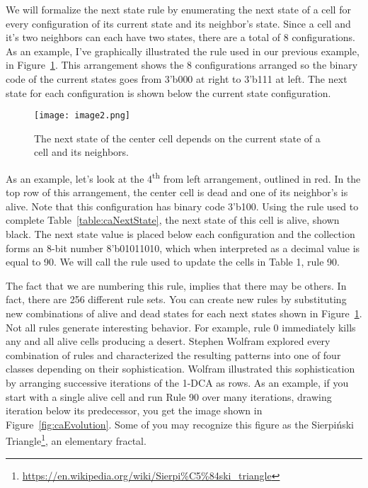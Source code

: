 We will formalize the next state rule by enumerating the next state of a
cell for every configuration of its current state and its neighbor's
state. Since a cell and it's two neighbors can each have two states,
there are a total of 8 configurations. As an example, I've graphically
illustrated the rule used in our previous example, in Figure~\ref{fig:caRule}. This
arrangement shows the 8 configurations arranged so the binary code of
the current states goes from 3'b000 at right to 3'b111 at left. The next
state for each configuration is shown below the current state
configuration.

\begin{figure}[ht]
\texttt{[image: image2.png]}
\caption{The next state of the center cell depends on the current state
of a cell and its neighbors.}
\label{fig:caRule}
\end{figure}


\pagebreak


As an example, let's look at the 4\textsuperscript{th} from left
arrangement, outlined in red. In the top row of this arrangement, the
center cell is dead and one of its neighbor's is alive.  Note that this
configuration has binary code 3'b100. Using the rule used to complete
Table~\ref{table:caNextState}, the next state of this cell is alive, shown black. The next
state value is placed below each configuration and the collection forms
an 8-bit number 8'b01011010, which when interpreted as a decimal value
is equal to 90. We will call the rule used to update the cells in Table
1, rule 90.

The fact that we are numbering this rule, implies that there may be
others. In fact, there are 256 different rule sets. You can create new
rules by substituting new combinations of alive and dead states for each
next states shown in Figure~\ref{fig:caRule}. Not all rules generate interesting
behavior. For example, rule 0 immediately kills any and all alive cells
producing a desert. Stephen Wolfram explored every combination of rules
and characterized the resulting patterns into one of four classes
depending on their sophistication. Wolfram illustrated this
sophistication by arranging successive iterations of the 1-DCA as rows.
As an example, if you start with a single alive cell and run Rule 90
over many iterations, drawing iteration below its predecessor, you get
the image shown in Figure~\ref{fig:caEvolution}. Some of you may recognize this figure as
the Sierpiński Triangle\footnote{\url{https://en.wikipedia.org/wiki/Sierpi\%C5\%84ski_triangle}},
an elementary fractal.

